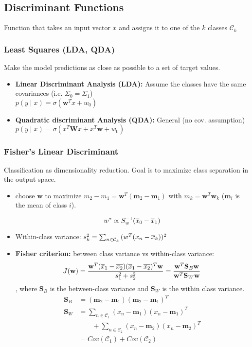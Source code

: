 \subsection{Discriminant Functions}
Function that takes an input vector $x$ and assigns it to one of the $k$ classes $\mathcal C_k$

\subsubsection{Least Squares (LDA, QDA)}
Make the model predictions as close as possible to a set of target values.
\begin{itemize}
	\item \textbf{Linear Discriminant Analysis (LDA):} Assume the classes have the same covariances (i.e. $\Sigma_0 = \Sigma_1$)\\ $p(y\mid x) = \sigma(\mathbf w^Tx + w_0)$
	\item \textbf{Quadratic discriminant Analysis (QDA):} General (no cov. assumption) \\
	$p(y\mid x) = \sigma(x^T\mathbf Wx + x^T\mathbf w + w_0)$ 

\end{itemize}



\subsubsection{Fisher's Linear Discriminant}
Classification as dimensionality reduction. Goal is to maximize class separation in the output space.

\begin{itemize}
	\item choose $\mathbf w$ to maximize $m_2 - m_1 = \mathbf w^T(\mathbf m_2 - \mathbf m_1)$ with $m_k = \mathbf w^T\mathbf w_k$ ($\mathbf m_i$ is the mean of class $i$).
	
	$$
		w^* \propto S_w^{-1}(\overline{x}_0 - \overline{x}_1)
	$$
	\item Within-class variance: $s_k^2 = \sum_{n\in \mathcal C_k}\mathbf (w^T(x_n - \overline{x}_k))^2$
	\item \textbf{Fisher criterion: } between class variance vs within-class variance: 
	$$
		J(\mathbf w) = \frac{\mathbf w^T(\overline{x}_1 - \overline{x_2})(\overline{x}_1 - \overline{x_2})^T\mathbf w}{s_1^2 + s_2^2} = \frac{\mathbf w^T\mathbf S_B \mathbf w}{\mathbf w^T\mathbf S_W \mathbf w }
	$$,
	where $\mathbf S_B$ is the between-class variance and $\mathbf S_W$ is the within class variance.
	\begin{align*}
		\mathbf S_B &= (\mathbf m_2 - \mathbf m_1)(\mathbf m_2 - \mathbf m_1)^T \\
		\mathbf S_W &= \sum_{n\in\mathcal C_1} (x_n - \mathbf m_1)(x_n - \mathbf m_1)^T \\
					& \quad\quad+   \sum_{n\in\mathcal C_2} (x_n - \mathbf m_2)(x_n - \mathbf m_2)^T \\
					&= \textit{Cov}(\mathcal C_1) + \textit{Cov}(\mathcal C_2)
	\end{align*}
\end{itemize}


